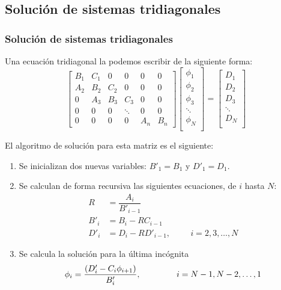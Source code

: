 \subsection{Soluci\'{o}n de sistemas tridiagonales}
\begin{frame}
\frametitle{Soluci\'{o}n de sistemas tridiagonales}
Una ecuaci\'{o}n tridiagonal la podemos escribir de la siguiente forma:
\[
\begin{bmatrix}
B_{1} & C_{1} & 0 & 0 & 0 & 0 \\
A_{2} & B_{2} & C_{2} & 0 & 0 & 0 \\
0 & A_{3} & B_{3} & C_{3} & 0 & 0 \\
0 & 0 & 0 & \ddots & 0 & 0 \\
0 & 0 & 0 & 0 & A_{n}& B_{n} 
\end{bmatrix}
\begin{bmatrix}
\phi_{1} \\
\phi_{2} \\
\phi_{3} \\
\ddots \\
\phi_{N} \\
\end{bmatrix} =
\begin{bmatrix}
D_{1} \\
D_{2} \\
D_{3} \\
\ddots \\
D_{N} \\
\end{bmatrix}
\]
\end{frame}
\begin{frame}
El algoritmo de soluci\'{o}n para esta matriz es el siguiente:
\begin{enumerate}
\item Se inicializan dos nuevas variables: $B'_{1}=B_{1}$ y $D'_{1}=D_{1}$.
\item Se calculan de forma recursiva las siguientes ecuaciones, de $i$ hasta $N$:
\[ \begin{split} R &= \dfrac{A_{i}}{B'_{i-1}} \\
B'_{i} &= B_{i} -RC_{i-1} \\
D'_{i} &= D_{i} - RD'_{i-1}, \hspace{1cm} i=2,3,\ldots,N
\end{split} \]
\end{enumerate}
\end{frame}
\begin{frame}
\begin{enumerate}
\setcounter{enumi}{2}
\item Se calcula la soluci\'{o}n para la \'{u}ltima inc\'{o}gnita
\[ \phi_{i} = \dfrac{(D'_{i}-C_{i}\phi_{i+1})}{B'_{i}}, \hspace{1.5 cm} i=N-1, N-2,\ldots,1\]
\end{enumerate}
\end{frame}
